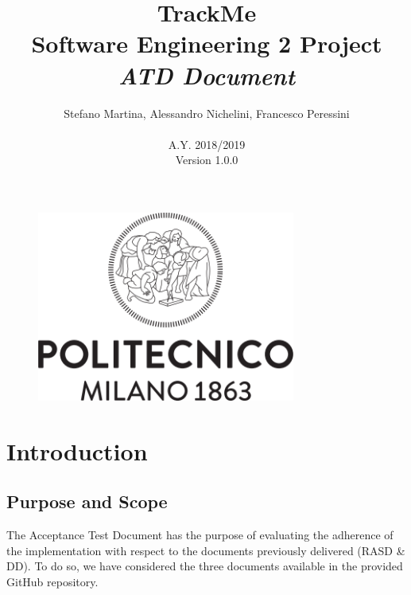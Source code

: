 \documentclass{article}
\begin{document}
\begin{figure}[t]
\centering
	\includegraphics[height=6.25cm,keepaspectratio]{Figures/logo}
\end{figure}

\title{TrackMe \\ Software Engineering 2 Project\\ \textit{ATD Document} }
\author{Stefano Martina, Alessandro Nichelini, Francesco Peressini
		\\ \\ A.Y. 2018/2019 \\ Version 1.0.0}
		
\maketitle
\newpage

\tableofcontents
\newpage

\section{Introduction}

\subsection{Purpose and Scope} 
The Acceptance Test Document has the purpose of evaluating the adherence of the implementation with respect to the  documents previously delivered (RASD \& DD).\newline
To do so, we have considered the three documents available in the provided GitHub repository.
\end{document}
